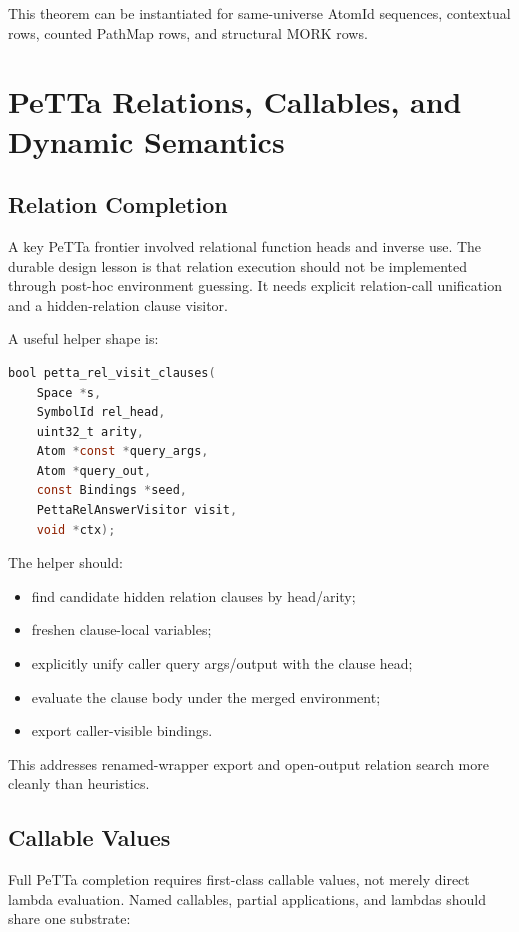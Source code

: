 \documentclass[11pt]{article}
\newcommand{\PeTTa}{PeTTa}
\newcommand{\PathMap}{PathMap}
\newcommand{\MORK}{MORK}
\begin{document}
This theorem can be instantiated for same-universe AtomId sequences, contextual rows, counted \PathMap{} rows, and structural \MORK{} rows.

\section{PeTTa Relations, Callables, and Dynamic Semantics}

\subsection{Relation Completion}

A key \PeTTa{} frontier involved relational function heads and inverse use.  The durable design lesson is that relation execution should not be implemented through post-hoc environment guessing.  It needs explicit relation-call unification and a hidden-relation clause visitor.

A useful helper shape is:

\begin{lstlisting}[language=C]
bool petta_rel_visit_clauses(
    Space *s,
    SymbolId rel_head,
    uint32_t arity,
    Atom *const *query_args,
    Atom *query_out,
    const Bindings *seed,
    PettaRelAnswerVisitor visit,
    void *ctx);
\end{lstlisting}

The helper should:

\begin{itemize}[leftmargin=*]
  \item find candidate hidden relation clauses by head/arity;
  \item freshen clause-local variables;
  \item explicitly unify caller query args/output with the clause head;
  \item evaluate the clause body under the merged environment;
  \item export caller-visible bindings.
\end{itemize}

This addresses renamed-wrapper export and open-output relation search more cleanly than heuristics.

\subsection{Callable Values}

Full \PeTTa{} completion requires first-class callable values, not merely direct lambda evaluation.  Named callables, partial applications, and lambdas should share one substrate:
\end{document}
